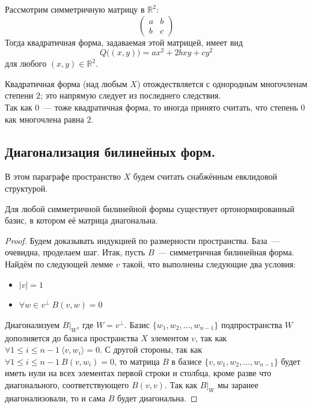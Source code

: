 \documentclass[11pt]{report}
\begin{document}
    \begin{example}
    Рассмотрим симметричную матрицу в $\mathbb{R}^2$:
    \begin{equation*}
        \begin{pmatrix}
        a & b\\
        b & c
        \end{pmatrix}
    \end{equation*}
    Тогда квадратичная форма, задаваемая этой матрицей, имеет вид
    \begin{equation*}
        Q\big((x, y)\big) = ax^2 + 2bxy + cy^2
    \end{equation*}
    для любого $(x, y) \in \mathbb{R}^2$.
    \end{example}

    \begin{remark}
    Квадратичная форма (над любым $X$) отождествляется с однородным многочленам степени $2$; это напрямую следует из последнего следствия. \\
    Так как $0$~--- тоже квадратичная форма, то иногда принято считать, что степень $0$ как многочлена равна $2$.
    \end{remark}

    \subsection{Диагонализация билинейных форм.}

    В этом параграфе пространство $X$ будем считать снабжённым евклидовой структурой.

    \begin{theorem}
    Для любой симметричной билинейной формы существует ортонормированный базис, в котором её матрица диагональна.
    \end{theorem}

    \begin{proof}
    Будем доказывать индукцией по размерности пространства. База~--- очевидна, проделаем шаг. Итак, пусть $B$~--- симметричная билинейная форма. Найдём по следующей лемме $v$ такой, что выполнены следующие два условия:
    \begin{itemize}
        \item $|v| = 1$
        \item $\forall w \in v^{\bot} \ B(v, w) = 0$
    \end{itemize}
    Диагонализуем $B|_{W}$, где $W = v^{\bot}$. Базис $\{w_1, w_2, \hdots, w_{n-1}\}$ подпространства $W$ дополняется до базиса пространства $X$ элементом $v$, так как $\forall 1 \leq i \leq n - 1 \ \langle v, w_{i} \rangle = 0$. С другой стороны, так как $\forall 1 \leq i \leq n - 1 \ B(v, w_{i}) = 0$, то матрица $B$ в базисе $\{v, w_1, w_2, \hdots, w_{n-1}\}$ будет иметь нули на всех элементах первой строки и столбца, кроме разве что диагонального, соответствующего $B(v, v)$. Так как $B|_{W}$ мы заранее диагонализовали, то и сама $B$ будет диагональна.
    \end{proof}
\end{document}
